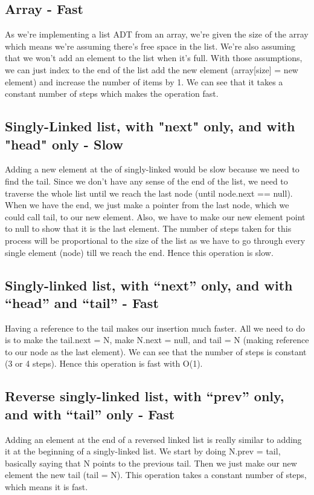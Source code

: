 \documentclass{article}
\begin{document}
\subsection{Array - Fast}
As we're implementing a list ADT from an array, we're given the size of the array which means we're assuming there's free space in the list. We're also assuming that we won't add an element to the list when it's full. With those assumptions, we can just index to the end of the list add the new element (array[size] = new element) and increase the number of items by 1. We can see that it takes a constant number of steps which makes the operation fast.

\subsection{Singly-Linked list, with "next" only, and with "head" only - Slow}
Adding a new element at the of singly-linked would be slow because we need to find the tail. Since we don't have any sense of the end of the list, we need to traverse the whole list until we reach the last node (until node.next == null). When we have the end, we just make a pointer from the last node, which we could call tail, to our new element. Also, we have to make our new element point to null to show that it is the last element. The number of steps taken for this process will be proportional to the size of the list as we have to go through every single element (node) till we reach the end. Hence this operation is slow.

\subsection{Singly-linked list, with “next” only, and with “head” and “tail” - Fast}
Having a reference to the tail makes our insertion much faster. All we need to do is to make the tail.next = N, make N.next = null, and tail = N (making reference to our node as the last element). We can see that the number of steps is constant (3 or 4 steps). Hence this operation is fast with O(1).

\subsection{Reverse singly-linked list, with “prev” only, and with “tail” only - Fast}
Adding an element at the end of a reversed linked list is really similar to adding it at the beginning of a singly-linked list. We start by doing N.prev = tail, basically saying that N points to the previous tail. Then we just make our new element the new tail (tail = N). This operation takes a constant number of steps, which means it is fast.
\end{document}
